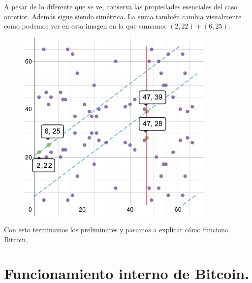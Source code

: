 \documentclass[twoside]{article}
\theoremstyle{definition}
\begin{document}
A pesar de lo diferente que se ve, conserva las propiedades esenciales del caso anterior. Además sigue siendo simétrica. La suma también cambia visualmente como podemos ver en esta imagen en la que sumamos $(2,22)+(6,25)$:
\begin{figure}[h!]
\includegraphics[scale=0.45]{sumfield}
\end{figure}

Con esto terminamos los preliminares y pasamos a explicar cómo funciona Bitcoin.
\newpage
\section{Funcionamiento interno de Bitcoin.}
\end{document}
